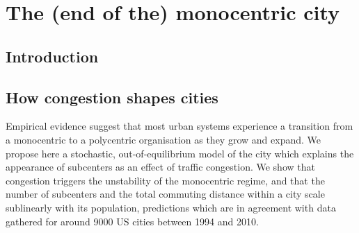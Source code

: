 %
\chapter{The (end of the) monocentric city}
\label{sec:related}


\section{Introduction}
\label{sec:introduction}

\section{How congestion shapes cities}
\label{sec:how_congestion_shapes_cities}

Empirical evidence suggest that most urban systems experience a
transition from a monocentric to a polycentric organisation as they
grow and expand. We propose here a stochastic, out-of-equilibrium model of the
city which explains the appearance of subcenters as an effect of
traffic congestion. We show that congestion triggers the unstability
of the monocentric regime, and that the number of subcenters and the
total commuting distance within a city scale sublinearly with its
population, predictions which are in agreement with data gathered for
around 9000 US cities between 1994 and 2010.\\


